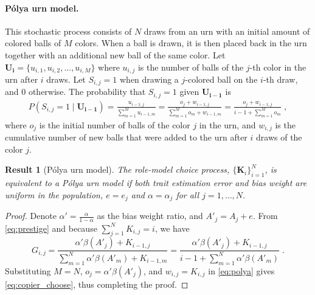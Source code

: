 \documentclass[12pt]{extarticle}
\let\vec\mathbf
\newtheorem{result}{Result}
\begin{document}
\paragraph{P\'{o}lya urn model.}
This stochastic process consists of $N$ draws from an urn with an initial amount of colored balls of $M$ colors. When a ball is drawn, it is then placed back in the urn together with an additional new ball of the same color.
Let $\vec{U_i} = \{u_{i,1},u_{i,2},...,u_{i,M}\}$  where $u_{i,j}$ is the number of balls of the $j$-th color in the urn after $i$ draws.
Let $S_{i,j}=1$ when drawing a $j$-colored ball on the $i$-th draw, and $0$ otherwise. The probability that $S_{i,j}=1$ given $\vec{U_{i-1}}$ is
\begin{equation}\label{eq:polya}
\begin{split}
P(S_{i,j} = 1 \mid \vec{U_{i-1}}) = 
\frac{u_{i-1,j}}{\sum\limits_{m=1}^{M} u_{i-1,m}} = 
\frac{o_j + w_{i-1,j}}{\sum\limits_{m=1}^{M} o_m + w_{i-1,m}} = 
\frac{o_j + w_{i-1,j}}{i-1 + \sum\limits_{m=1}^{M} o_m} \;,
\end{split}
\end{equation}
where $o_j$ is the initial number of balls of the color $j$ in the urn, and $w_{i,j}$ is the cumulative number of new balls that were added to the urn after $i$ draws of the color $j$.
\\

\begin{result}[P{\'{o}}lya urn model]\label{result:polya}
The role-model choice process, $\big\{\vec{K}_i\big\}_{i=1}^N$, is equivalent to a \textit{P\'{o}lya urn model} if both trait estimation error and bias weight are uniform in the population, $e=e_j$ and $\alpha=\alpha_j$ for all $j=1,\ldots,N$.
\end{result}

\begin{proof} 
Denote $\alpha'=\frac{\alpha}{1-\alpha}$ as the bias weight ratio, and $A'_j=A_j+e$. From \cref{eq:prestige} and because $\sum_{j=1}^{N}{K_{i,j}}=i$, we have
\begin{equation}\label{eq:copier_choose}
G_{i,j} = 
\frac{\alpha'\beta(A'_j) + K_{i-1,j}}{\sum\limits_{m=1}^{N} \alpha'\beta(A'_m) + K_{i-1,m}}
 =\frac{\alpha'\beta(A'_j) + K_{i-1,j}}{i-1 + \sum\limits_{m=1}^{N}\alpha'\beta(A'_m)} \;.
\end{equation}
Substituting $M=N$, $o_j = \alpha'\beta(A'_j)$, and $w_{i,j} = K_{i,j}$ in \cref{eq:polya} gives \cref{eq:copier_choose}, thus completing the proof.
\end{proof} 
\end{document}
